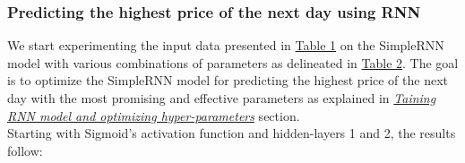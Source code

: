 \subsubsection{Predicting the highest price of the next day using RNN}
\label{chap:Predicting the highest price of the next day using RNN}

\quad We start experimenting the input data presented in \hyperref[table:TrainingFeatures]{Table 1} on the SimpleRNN model with various combinations of parameters as delineated in \hyperref[table:Hyper-parameters for SimpleRNN]{Table 2}. The goal is to optimize the SimpleRNN model for predicting the highest price of the next day with the most promising and effective parameters as explained in \hyperref[chap:Training RNN model and optimizing hyper-parameters]{\textit{Taining RNN model and optimizing hyper-parameters}} section.\\

Starting with Sigmoid's activation function and hidden-layers 1 and 2, the results follow:

